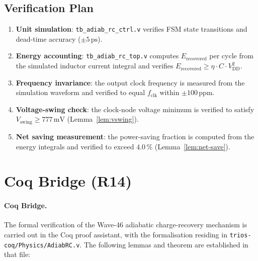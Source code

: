 \subsection{Verification Plan}

\begin{enumerate}
  \item \textbf{Unit simulation}: \texttt{tb\_adiab\_rc\_ctrl.v} verifies
        FSM state transitions and dead-time accuracy ($\pm 5\,\text{ps}$).
  \item \textbf{Energy accounting}: \texttt{tb\_adiab\_rc\_top.v} computes
        $E_{\mathrm{recovered}}$ per cycle from the simulated inductor current
        integral and verifies $E_{\mathrm{recovered}} \geq \eta \cdot C \cdot V_{\mathrm{DD}}^{2}$.
  \item \textbf{Frequency invariance}: the output clock frequency is measured
        from the simulation waveform and verified to equal $f_{\mathrm{clk}}$
        within $\pm 100\,\text{ppm}$.
  \item \textbf{Voltage-swing check}: the clock-node voltage minimum is
        verified to satisfy $V_{\mathrm{swing}} \geq 777\,\text{mV}$
        (Lemma~\ref{lem:vswing}).
  \item \textbf{Net saving measurement}: the power-saving fraction is
        computed from the energy integrals and verified to exceed
        $4.0\,\%$ (Lemma~\ref{lem:net-save}).
\end{enumerate}

\section{Coq Bridge (R14)}
\label{sec:coq-bridge-w46}

\paragraph{Coq Bridge.}
The formal verification of the Wave-46 adiabatic charge-recovery mechanism is
carried out in the Coq proof assistant, with the formalisation residing in
\texttt{trios-coq/Physics/AdiabRC.v}.
The following lemmas and theorem are established in that file:

